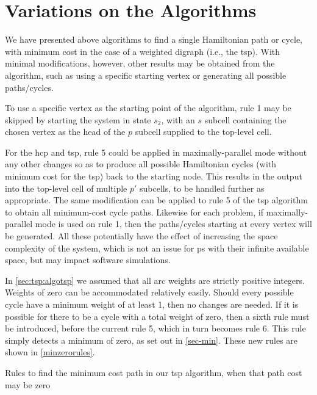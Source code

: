 \section{\label{sec:tsp:variations}Variations on the Algorithms}
We have presented above algorithms to find a single Hamiltonian path or cycle, with minimum cost in the case of a weighted digraph (i.e., the \gls{tsp}).  With minimal modifications, however, other results may be obtained from the algorithm, such as using a specific starting vertex or generating all possible paths/cycles.

To use a specific vertex as the starting point of the algorithm, rule 1 may be skipped by starting the system in state \(s_2\), with an \(s\) subcell containing the chosen vertex as the head of the \(p\) subcell supplied to the top-level cell.

For the \gls{hcp} and \gls{tsp}, rule 5 could be applied in maximally-parallel mode without any other changes so as to produce all possible Hamiltonian cycles (with minimum cost for the \gls{tsp}) back to the starting node.  This results in the output into the top-level cell of multiple \(p'\) subcells, to be handled further as appropriate.  The same modification can be applied to rule 5 of the \gls{tsp} algorithm to obtain all minimum-cost cycle paths.  Likewise for each problem, if maximally-parallel mode is used on rule 1, then the paths/cycles starting at every vertex will be generated.  All these potentially have the effect of increasing the space complexity of the system, which is not an issue for \gls{ps} with their infinite available space, but may impact software simulations.

In \autoref{sec:tsp:algotsp} we assumed that all arc weights are strictly positive integers.  Weights of zero can be accommodated relatively easily.  Should every possible cycle have a minimum weight of at least 1, then no changes are needed.  If it is possible for there to be a cycle with a total weight of zero, then a sixth rule must be introduced, before the current rule 5, which in turn becomes rule 6.  This rule simply detects a minimum of zero, as set out in \autoref{sec-min}.  These new rules are shown in \autoref{minzerorules}.


\begin{cprulesetfloat}
\begin{cpruleset}
    
    
\end{cpruleset}
\caption[Rules to find the minimum cost path when it may be zero]{\label{minzerorules}Rules to find the minimum cost path in our \gls{tsp} algorithm, when that path cost may be zero}
\end{cprulesetfloat}
